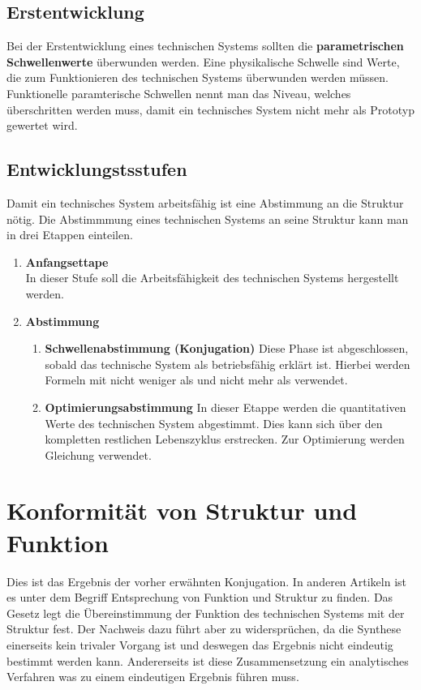 \documentclass[DIV=22, 10pt, a4paper]{scrartcl}
\newcommand\descitem[1]{\item{\bfseries #1}}
\begin{document}
    \subsection{Erstentwicklung}
        Bei der Erstentwicklung eines technischen Systems sollten die \textbf{parametrischen Schwellenwerte} überwunden werden.
        Eine physikalische Schwelle sind Werte, die zum Funktionieren des technischen Systems überwunden werden müssen.
        Funktionelle paramterische Schwellen nennt man das Niveau, welches überschritten werden muss, damit ein technisches System nicht mehr als Prototyp gewertet wird.
        
    \subsection{Entwicklungstsstufen}
    Damit ein technisches System arbeitsfähig ist eine Abstimmung an die Struktur nötig. 
    Die Abstimmmung eines technischen Systems an seine Struktur kann man in drei Etappen einteilen.

    \begin{enumerate}
        \descitem{Anfangsettape}\\
        In dieser Stufe soll die Arbeitsfähigkeit des technischen Systems hergestellt werden.
        \descitem{Abstimmung}
        \begin{enumerate}
            \descitem{Schwellenabstimmung (Konjugation)} Diese Phase ist abgeschlossen, sobald das technische System als betriebsfähig erklärt ist. Hierbei werden Formeln mit \glqq nicht weniger als\grqq{} und \glqq nicht mehr als\grqq{} verwendet.
            \descitem{Optimierungsabstimmung} In dieser Etappe werden die quantitativen Werte des technischen System abgestimmt. Dies kann sich über den kompletten restlichen Lebenszyklus erstrecken. Zur Optimierung werden Gleichung verwendet.
        \end{enumerate}
    \end{enumerate}

    \section{Konformität von Struktur und Funktion}
    Dies ist das Ergebnis der vorher erwähnten Konjugation. 
    In anderen Artikeln ist es unter dem Begriff \glqq Entsprechung von Funktion und Struktur\grqq{} zu finden.
    Das Gesetz legt die Übereinstimmung der Funktion des technischen Systems mit der Struktur fest.
    Der Nachweis dazu führt aber zu widersprüchen, da die Synthese einerseits kein trivaler Vorgang ist und deswegen das Ergebnis nicht eindeutig bestimmt werden kann.
    Andererseits ist diese Zusammensetzung ein analytisches Verfahren was zu einem eindeutigen Ergebnis führen muss.
\end{document}
